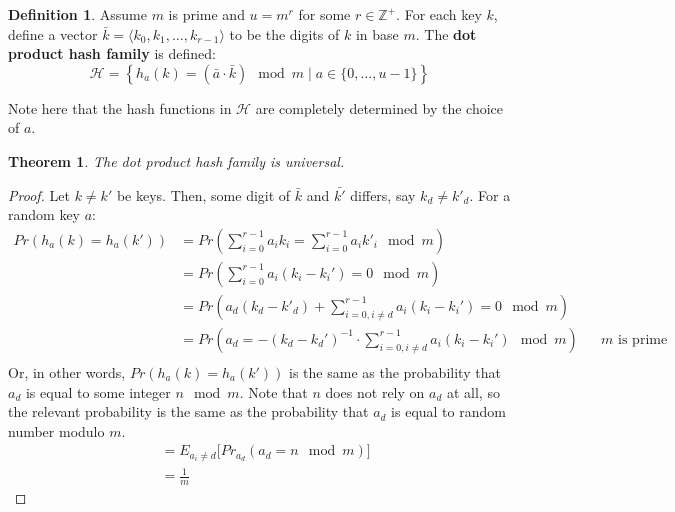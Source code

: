 \documentclass[11pt]{article}
\theoremstyle{plain}
\newtheorem{thm}{Theorem}
\theoremstyle{definition}
\newtheorem*{defn}{Definition}
\newcommand{\Z}{\mathbb{Z}}
\begin{document}
\begin{defn}
    Assume $m$ is prime and $u = m^r$ for some $r \in \Z^+$. For each key $k$, define a vector 
    $\bar{k} = \langle k_0, k_1, \ldots, k_{r-1}\rangle$ to be the digits of $k$ in base $m$. 
    The \textbf{dot product hash family} is defined:
    $$\mathcal{H} = \left\{ h_a(k) = (\bar{a} \cdot \bar{k})\mod m \mid a \in \{0, \ldots, u-1\}\right\}$$
\end{defn}

Note here that the hash functions in $\mathcal{H}$ are completely determined by the choice of $a$. 

\begin{thm}
    The dot product hash family is universal.
\end{thm}

\begin{proof}
    Let $k \neq k'$ be keys. Then, some digit of $\bar{k}$ and $\bar{k'}$ differs, say $k_d \neq k'_d$.
    For a random key $a$:
    \begin{align*}
        Pr(h_a(k) = h_a(k')) 
        &= Pr\left(\sum_{i = 0}^{r-1}a_ik_i = \sum_{i=0}^{r-1} a_i k'_i \mod m\right)\\
        &= Pr\left(\sum_{i = 0}^{r-1}a_i(k_i - k_i') = 0 \mod m\right)\\
        &= Pr\left(a_d(k_d - k'_d) + \sum_{i = 0, i \neq d}^{r-1}a_i(k_i - k_i') = 0 \mod m\right)\\
        &= Pr\left(a_d = -(k_d - k_d')^{-1} \cdot \sum_{i = 0, i \neq d}^{r-1}a_i(k_i - k_i') \mod m\right)
        && \text{$m$ is prime}\\
    \end{align*}
    Or, in other words, $Pr(h_a(k) = h_a(k'))$ is the same as the probability that $a_d$ is equal to 
    some integer $n \mod m$. Note that $n$ does not rely on $a_d$ at all, so the relevant probability
    is the same as the probability that $a_d$ is equal to random number modulo $m$.
    \begin{align*}
        &= E_{a_i \neq d}\big[Pr_{a_d}(a_d = n \mod m)\big]\\
        &= \frac{1}{m}
    \end{align*}
\end{proof}




 
\end{document}
